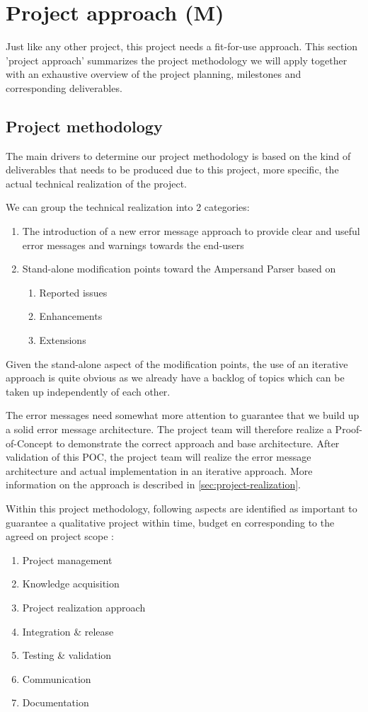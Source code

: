 \section{Project approach (M)}
\label{sec:project-approach}
Just like any other project, this project needs a fit-for-use approach. 
This section 'project approach' summarizes the project methodology we will apply together with an exhaustive overview of the project planning, milestones and corresponding deliverables.
\subsection{Project methodology}
The main drivers to determine our project methodology is based on the kind of deliverables that needs to be produced due to this project, more specific, the actual technical realization of the project.

We can group the technical realization into 2 categories:
\begin{enumerate}
	\item The introduction of a new error message approach to provide clear and useful error messages and warnings towards the end-users
	\item Stand-alone modification points toward the Ampersand Parser based on
	\begin{enumerate}
		\item Reported issues
		\item Enhancements
		\item Extensions
	\end {enumerate}
\end {enumerate}

Given the stand-alone aspect of the modification points, the use of an iterative approach is quite obvious as we already have a backlog of topics which can be taken up independently of each other. 

The error messages need somewhat more attention to guarantee that we build up a solid error message architecture. 
The project team will therefore realize a Proof-of-Concept to demonstrate the correct approach and base architecture. 
After validation of this POC, the project team will realize the error message architecture and actual implementation in an iterative approach.
More information on the approach is described in \autoref{sec:project-realization}.

Within this project methodology, following aspects are identified as important to guarantee a qualitative project within time, budget en corresponding to the agreed on project scope : 
\begin{enumerate}
	\item Project management
	\item Knowledge acquisition 
	\item Project realization approach
	\item Integration \& release
	\item Testing \& validation
	\item Communication
	\item Documentation
\end {enumerate}

